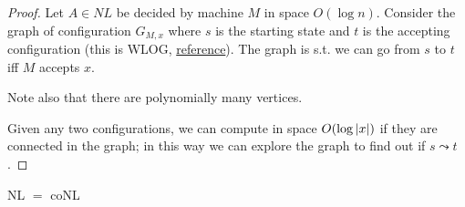     \begin{proof}
        Let $A \in NL$ be decided by machine $M$ in space $O(\log n)$.
        Consider the graph of configuration $G_{M,x}$ where $s$ is the starting state and $t$ is the accepting configuration (this is WLOG, \href{https://people.seas.harvard.edu/~salil/cs221/spring10/lec5.pdf}{reference}).
        The graph is s.t. we can go from $s$ to $t$ iff $M$ accepts $x$.

        Note also that there are polynomially many vertices.

        Given any two configurations, we can compute in space $O(\log \vert x \vert)$ if they are connected in the graph; in this way we can explore the graph to find out if $s \leadsto t$.
    \end{proof}

    \begin{theorem}\label{thm:nl_conl}
        NL $=$ coNL
    \end{theorem}

